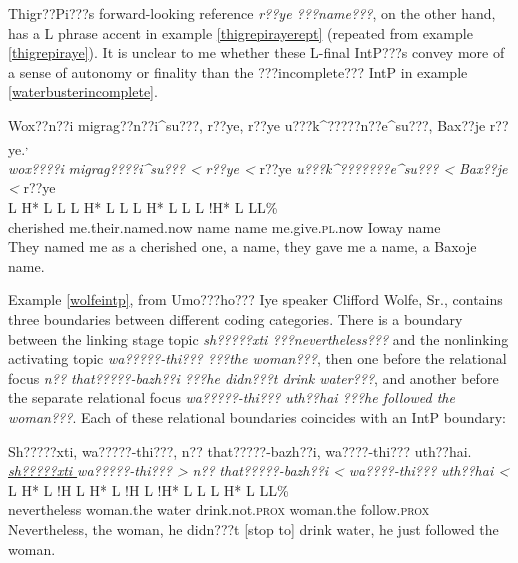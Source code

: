 \documentclass[output=paper]{LSP/langsci}
\begin{document}
Thigr??Pi???s forward-looking reference \emph{r??ye ???name???}, on the other hand, has a L phrase accent in example \ref{thigrepirayerept} (repeated from example \ref{thigrepiraye}). It is unclear to me whether these L-final IntP???s convey more of a sense of autonomy or finality than the ???incomplete??? IntP in example \ref{waterbusterincomplete}.

\ea\label{thigrepirayerept}
Wox??n??i migrag??n??i\^{}su???, r??ye, r??ye u???k\^{}?????n??e\^{}su???, Bax??je r??ye.\footnotemark\textsuperscript{,} \footnotemark\\
\glll	\emph{wox????i} 	\emph{migrag????i\^{}su??? <}		\emph{r??ye <}	r??ye		\emph{u???k\^{}???????e\^{}su??? <}	\emph{Bax??je <}		r??ye\\
	{\ob L H* L}		{L\cb}	{\ob L H* L L\cb}	{\ob L H* L}	{L\cb}	{\ob L !H* L} 		{L\cb{}L\%}\\
	cherished		me.their.named.now			name			name		me.give.\textsc{pl}.now		Ioway				name\\
\glt	They named me as a cherished one, a name, they gave me a name, a Baxoje name.
\z

Example \ref{wolfeintp}, from Umo???ho??? Iye speaker Clifford Wolfe, Sr., contains three boundaries between different coding categories. There is a boundary between the linking stage topic \emph{sh?????xti ???nevertheless???} and the nonlinking activating topic \emph{wa?????-thi??? ???the woman???}, then one before the relational focus \emph{n?? that?????-bazh??i ???he didn???t drink water???}, and another before the separate relational focus \emph{wa?????-thi??? uth??hai ???he followed the woman???}. Each of these relational boundaries coincides with an IntP boundary:

\ea\label{wolfeintp}
 	Sh?????xti, wa?????-thi???, n?? that?????-bazh??i, wa????-thi??? uth??hai.\footnotemark\\
\glll	\emph{\underline{sh?????xti }}	\emph{wa?????-thi??? >}		\emph{n??} 		\emph{that?????-bazh??i <}		\emph{wa????-thi???} 	\emph{uth??hai <}\\
	{\ob L H* L !H\cb}			{\ob L H* L !H\cb}		{\ob L}		{!H* L L\cb}	{\ob L H* L}		{L\cb{}L\%}\\
	nevertheless				woman.the			water			drink.not.\textsc{prox} 		woman.the		follow.\textsc{prox}\\
\glt	Nevertheless, the woman, he didn???t [stop to] drink water, he just followed the woman. 
\z
\end{document}
